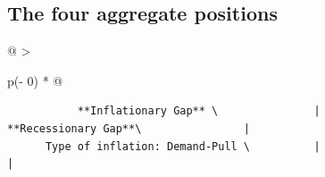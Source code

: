 \documentclass[
  letterpaper,
  DIV=11,
  numbers=noendperiod]{scrartcl}
\begin{document}
\subsection{The four aggregate
positions}\label{the-four-aggregate-positions}

\begin{longtable}[]{@{}
  >{\raggedright\arraybackslash}p{(\columnwidth - 0\tabcolsep) * }@{}}
\toprule\noalign{}
\endhead
\bottomrule\noalign{}
\endlastfoot
\begin{minipage}[t]{\linewidth}\raggedright
\begin{verbatim}
           **Inflationary Gap** \               |               **Recessionary Gap**\                |
      Type of inflation: Demand-Pull \          |                                                    |
\end{verbatim}


\end{minipage}
\end{longtable}
\end{document}
